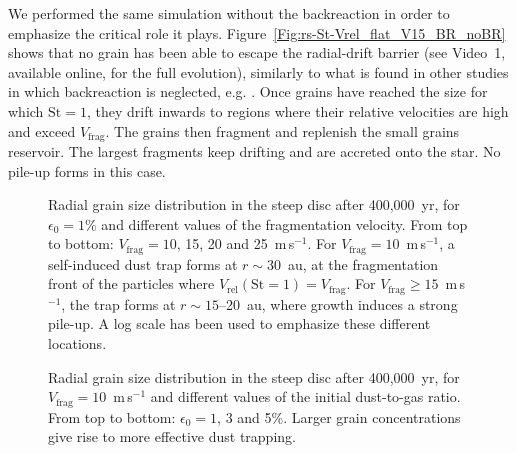 \documentclass[a4paper,fleqn,usenatbib]{mnras}
\newcommand{\Vrel}{V_\mathrm{rel}}    %
\newcommand{\Vfrag}{V_\mathrm{frag}}  %
\newcommand{\St}{\mathrm{St}}         %
\begin{document}
\begin{figure*}
\centering
{}
\caption{Top: same as Fig.~\ref{Fig:rs-St-Vrel_flat_V15_BR_evol} after 200,000~yr. Bottom: same simulation with backreaction turned off. In this case, when grains grow and reach St~$\sim1$, they drift rapidly towards the central star while fragmenting and replenishing the small grains reservoir. Video~1 (available online) shows the full evolution.}
\label{Fig:rs-St-Vrel_flat_V15_BR_noBR}
\end{figure*}

We performed the same simulation without the backreaction in order to emphasize the critical role it plays. Figure~\ref{Fig:rs-St-Vrel_flat_V15_BR_noBR} shows that no grain has been able to escape the radial-drift barrier (see Video~1, available online, for the full evolution), similarly to what is found in other studies in which backreaction is neglected, e.g. \citet{Brauer2008,Birnstiel2010,Windmark2012}. Once grains have reached the size for which $\St=1$, they drift inwards to regions where their relative velocities are high and exceed $\Vfrag$. The grains then fragment and replenish the small grains reservoir. The largest fragments keep drifting and are accreted onto the star. No pile-up forms in this case.

\begin{figure}
\centering
{}
\caption{Radial grain size distribution in the steep disc after 400,000~yr, for $\epsilon_0=1\%$ and different values of the fragmentation velocity. From top to bottom: $\Vfrag=10$, 15, 20 and 25~m\,s$^{-1}$. For $\Vfrag=10$~m\,s$^{-1}$, a self-induced dust trap forms at $r\sim30$~au, at the fragmentation front of the particles where $\Vrel(\St=1)=\Vfrag$. For $\Vfrag\ge15$~m\,s$^{-1}$, the trap forms at \mbox{$r\sim15$--20~au}, where growth induces a strong pile-up. A log scale has been used to emphasize these different locations.}
\label{Fig:rs-St_steep_e1}
\end{figure}

\begin{figure}
\centering
{}
\caption{Radial grain size distribution in the steep disc after 400,000~yr, for $\Vfrag=10$~m\,s$^{-1}$ and different values of the initial dust-to-gas ratio. From top to bottom: $\epsilon_0=1$, 3 and 5\%. Larger grain concentrations give rise to more effective dust trapping.}
\label{Fig:rs-St_steep_V10}
\end{figure}
\end{document}
